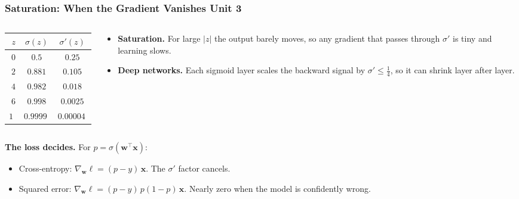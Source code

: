 \documentclass[12pt]{beamer}
\newcommand{\FrameTitle}[2]{\frametitle{#1 \hfill \small\textnormal{\textcolor{midgray}{#2}}}}
\begin{document}
\begin{frame}\FrameTitle{Saturation: When the Gradient Vanishes}{Unit 3}
    \begin{columns}[c]
        \begin{column}{0.38\textwidth}
            \centering
            \begin{tabular}{rcc}
                \toprule
                $z$ & $\sigma(z)$ & $\sigma'(z)$ \\
                \midrule
                $0$  & $0.5$     & $0.25$ \\
                $2$  & $0.881$   & $0.105$ \\
                $4$  & $0.982$   & $0.018$ \\
                $6$  & $0.998$   & $0.0025$ \\
                $10$ & $0.99995$ & $0.000045$ \\
                \bottomrule
            \end{tabular}
        \end{column}
        \begin{column}{0.60\textwidth}
            \begin{itemize}
                \item \textbf{Saturation.} For large $|z|$ the output barely
                      moves, so any gradient that passes through $\sigma'$
                      is tiny and learning slows.
                \item \textbf{Deep networks.} Each sigmoid layer scales the
                      backward signal by $\sigma' \le \tfrac14$, so it can
                      shrink layer after layer.
            \end{itemize}
        \end{column}
    \end{columns}

    \bigskip
    \textbf{The loss decides.} For $p = \sigma(\symbf{w}^\top\symbf{x})$:
    \begin{itemize}
        \item Cross-entropy: $\nabla_{\symbf{w}}\ell = (p-y)\,\symbf{x}$.
              The $\sigma'$ factor cancels.
        \item Squared error: $\nabla_{\symbf{w}}\ell = (p-y)\,p(1-p)\,\symbf{x}$.
              Nearly zero when the model is confidently wrong.
    \end{itemize}
\end{frame}

\end{document}
